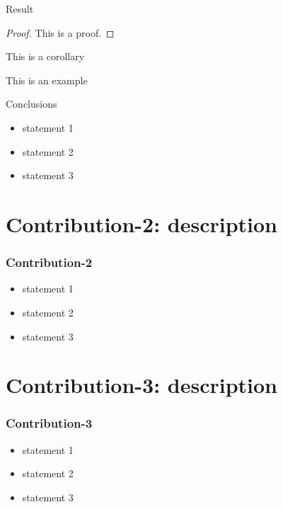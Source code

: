\documentclass{beamer}
\begin{document}
\begin{frame}{Result}
    \begin{proof} 
        This is a proof. 
    \end{proof}
    
    \begin{corollary}
        This is a corollary
    \end{corollary}
    
    \begin{example}
        This is an example 
    \end{example}
    
\end{frame}

\begin{frame}{Conclusions}
\begin{itemize}
   \item statement 1
    \item statement 2
    \item statement 3
\end{itemize}
\end{frame}

\section{Contribution-2: description }
\begin{frame} [allowframebreaks]
\frametitle{Contribution-2}

\begin{itemize}
    \item statement 1
    \item statement 2
    \item statement 3
\end{itemize}


\end{frame}



\section{Contribution-3: description }
\begin{frame} [allowframebreaks]
\frametitle{Contribution-3}

\begin{itemize}
    \item statement 1
    \item statement 2
    \item statement 3
\end{itemize}


\end{frame}
\end{document}
